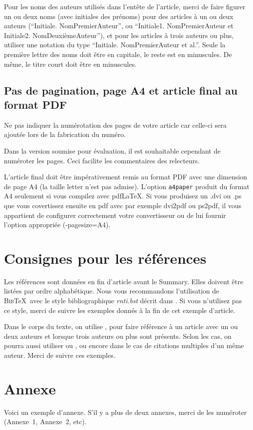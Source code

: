 \documentclass[a4paper,pagenum,french,showlayout]{rnti}
\begin{document}
Pour les noms des auteurs utilisés dans l'entête de l'article, merci
de faire figurer un ou deux noms (avec initiales des prénoms) pour
des articles à un ou deux auteurs (``Initiale. NomPremierAuteur'',
ou ``Initiale1. NomPremierAuteur et Initiale2. NomDeuxièmeAuteur''),
et pour les articles à trois auteurs ou plus, utiliser une notation
du type ``Initiale. NomPremierAuteur et al.''. Seule la première
lettre des noms doit être en capitale, le reste est en minuscules.
De même, le titre court doit être en minuscules.



\subsection{Pas de pagination, page A4 et article final au format PDF}

Ne pas indiquer la numérotation des pages de votre article car
celle-ci sera ajoutée lors de la fabrication du numéro.

Dans la version soumise pour évaluation, il est souhaitable
cependant de numéroter les pages. Ceci facilite les commentaires des
relecteurs.

L'article final doit être impérativement remis au format PDF avec
une dimension de page A4 (la taille letter n'est pas admise).
L'option \texttt{a4paper} produit du format A4 seulement si vous
compilez avec pdf\LaTeX{}. Si vous produisez un .dvi ou .ps que vous
covertissez ensuite en pdf avec par exemple dvi2pdf ou ps2pdf, il
vous appartient de configurer correctement votre convertisseur ou de
lui fournir l'option appropriée (-pagesize=A4).


\section{Consignes pour les références}

Les références sont données en fin d'article avant le
\guilo{}Summary\guilf{}. Elles doivent être listées par ordre
alphabétique.  Nous vous recommandons l'utilisation de
\textsc{Bib}\TeX\ avec le style bibliographique \textit{rnti.bst}
décrit dans \citet{ritschard:2005rnti}. Si vous n'utilisez pas ce
style, merci de suivre les exemples donnés à la fin de cet exemple
d'article.

Dans le corps du texte, on utilise \citet{thSau00}, \citet{HolWil90}
pour faire référence à un article avec un ou deux auteurs et
\citet{lioni01} lorsque trois auteurs ou plus sont présents.  Selon
les cas, on pourra aussi utiliser \citep{thSau00} ou
\citep[voir][chapitre 4]{brei:frie:olsh:ston:1984}, ou encore
\citet{quin:1986ID3,quin:1993} dans le cas de citations multiples
d'un même auteur. Merci de suivre ces exemples.






\appendix
\section*{Annexe}

Voici un exemple d'annexe. S'il y a plus de deux annexes, merci de
les numéroter (Annexe~1, Annexe~2, etc).

\Fr
\end{document}
